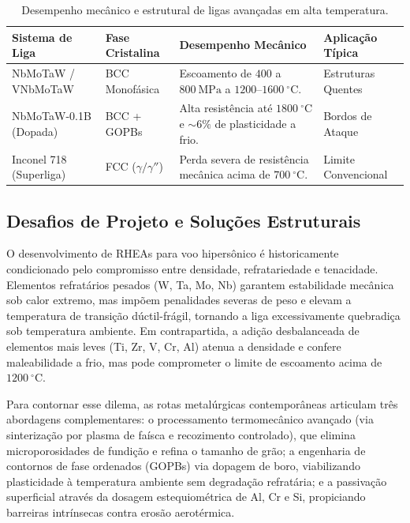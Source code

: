 \begin{table}[!htbp]
\centering
\caption{Desempenho mecânico e estrutural de ligas avançadas em alta temperatura.}\label{tab:hea_desempenho_mecanico}
\small
\begin{tabularx}{\textwidth}{>{\raggedright\arraybackslash}X l >{\raggedright\arraybackslash}X >{\raggedright\arraybackslash}X}
\toprule
\textbf{Sistema de Liga} & \textbf{Fase Cristalina} & \textbf{Desempenho Mecânico} & \textbf{Aplicação Típica} \\
\midrule
NbMoTaW / VNbMoTaW & BCC Monofásica & Escoamento de $400$ a $800~\mathrm{MPa}$ a $1200$--$1600~^\circ\mathrm{C}$. & Estruturas Quentes \\
NbMoTaW-0.1B (Dopada) & BCC + GOPBs & Alta resistência até $1800~^\circ\mathrm{C}$ e $\sim 6\%$ de plasticidade a frio. & Bordos de Ataque \\
Inconel 718 (Superliga) & FCC ($\gamma / \gamma''$) & Perda severa de resistência mecânica acima de $700~^\circ\mathrm{C}$. & Limite Convencional \\
\bottomrule
\end{tabularx}
\end{table}

\subsection{Desafios de Projeto e Soluções Estruturais}\label{subsec:desafios_solucoes}

O desenvolvimento de RHEAs para voo hipersônico é historicamente condicionado pelo compromisso entre densidade, refratariedade e tenacidade. Elementos refratários pesados (W, Ta, Mo, Nb) garantem estabilidade mecânica sob calor extremo, mas impõem penalidades severas de peso e elevam a temperatura de transição dúctil-frágil, tornando a liga excessivamente quebradiça sob temperatura ambiente. Em contrapartida, a adição desbalanceada de elementos mais leves (Ti, Zr, V, Cr, Al) atenua a densidade e confere maleabilidade a frio, mas pode comprometer o limite de escoamento acima de $1200~^\circ\mathrm{C}$.

Para contornar esse dilema, as rotas metalúrgicas contemporâneas articulam três abordagens complementares: o processamento termomecânico avançado (via sinterização por plasma de faísca e recozimento controlado), que elimina microporosidades de fundição e refina o tamanho de grão; a engenharia de contornos de fase ordenados (GOPBs) via dopagem de boro, viabilizando plasticidade à temperatura ambiente sem degradação refratária; e a passivação superficial através da dosagem estequiométrica de Al, Cr e Si, propiciando barreiras intrínsecas contra erosão aerotérmica.

